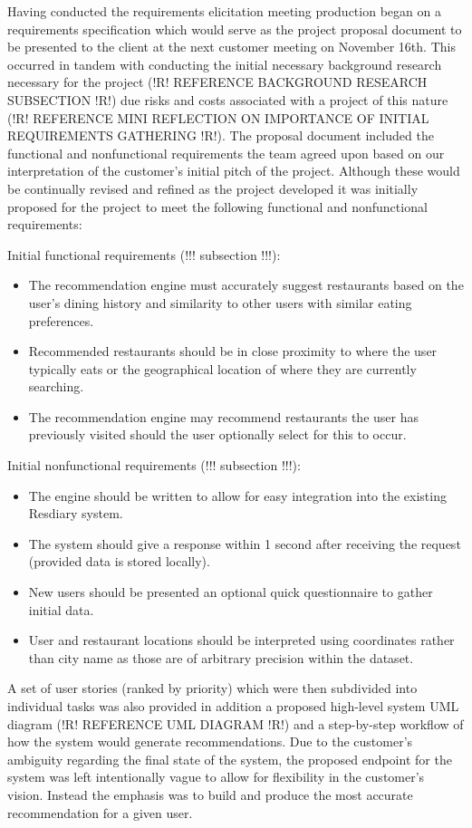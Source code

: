 \documentclass{l3proj}
\begin{document}
Having conducted the requirements elicitation meeting production began on a requirements specification which would serve as the project proposal document to be presented to the client at the next customer meeting on November 16th. This occurred in tandem with conducting the initial necessary background research necessary for the project (!R! REFERENCE BACKGROUND RESEARCH SUBSECTION !R!) due risks and costs associated with a project of this nature (!R! REFERENCE MINI REFLECTION ON IMPORTANCE OF INITIAL REQUIREMENTS GATHERING !R!). The proposal document included the functional and nonfunctional requirements the team agreed upon based on our interpretation of the customer’s initial pitch of the project. Although these would be continually revised and refined as the project developed it was initially proposed for the project to meet the following functional and nonfunctional requirements:

Initial functional requirements (!!! subsection !!!):
\begin{itemize}
\item The recommendation engine must accurately suggest restaurants based on the user’s dining history and similarity to other users with similar eating preferences.
\item Recommended restaurants should be in close proximity to where the user typically eats or the geographical location of where they are currently searching.
\item The recommendation engine may recommend restaurants the user has previously visited should the user optionally select for this to occur.
\end{itemize}

Initial nonfunctional requirements (!!! subsection !!!):
\begin{itemize}
\item The engine should be written to allow for easy integration into the existing Resdiary system.
\item The system should give a response within 1 second after receiving the request (provided data is stored locally).
\item New users should be presented an optional quick questionnaire to gather initial data.
\item User and restaurant locations should be interpreted using coordinates rather than city  name as those are of arbitrary precision within the dataset.
\end{itemize}

A set of user stories (ranked by priority) which were then subdivided into individual tasks was also provided in addition a proposed high-level system UML diagram (!R! REFERENCE UML DIAGRAM !R!) and a step-by-step workflow of how the system would generate recommendations. Due to the customer’s ambiguity regarding the final state of the system, the proposed endpoint for the system was left intentionally vague to allow for flexibility in the customer’s vision. Instead the emphasis was to build and produce the most accurate recommendation for a given user.
\end{document}
